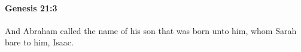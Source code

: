 
		\paragraph{Genesis 21:3} %
			\label{GENESIS-21-3}

			And Abraham called the name of his son that was born unto him, whom Sarah bare to him, Isaac.


